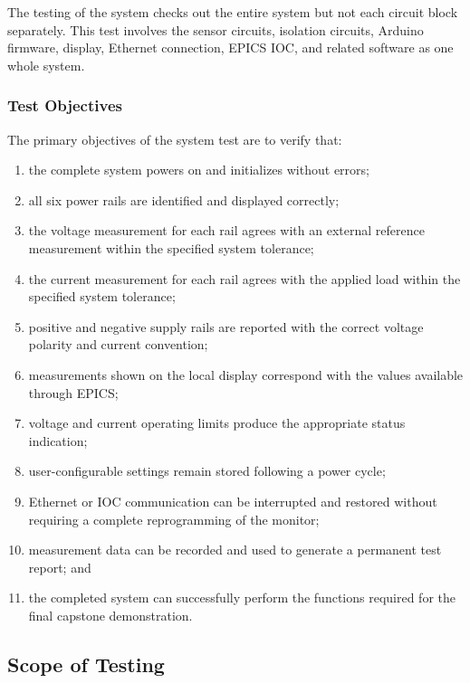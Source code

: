 The testing of the system checks out the entire system but not each circuit block separately. This test involves the sensor circuits, isolation circuits, Arduino firmware, display, Ethernet connection, EPICS IOC, and related software
as one whole system.

\subsubsection{Test Objectives}

The primary objectives of the system test are to verify that:

\begin{enumerate}
    \item the complete system powers on and initializes without errors;
    \item all six power rails are identified and displayed correctly;
    \item the voltage measurement for each rail agrees with an external reference
    measurement within the specified system tolerance;
    \item the current measurement for each rail agrees with the applied load within
    the specified system tolerance;
    \item positive and negative supply rails are reported with the correct voltage
    polarity and current convention;
    \item measurements shown on the local display correspond with the values available
    through EPICS;
    \item voltage and current operating limits produce the appropriate status indication;
    \item user-configurable settings remain stored following a power cycle;
    \item Ethernet or IOC communication can be interrupted and restored without
    requiring a complete reprogramming of the monitor;
    \item measurement data can be recorded and used to generate a permanent test report;
    and
    \item the completed system can successfully perform the functions required for
    the final capstone demonstration.
\end{enumerate}

\subsection{Scope of Testing}

